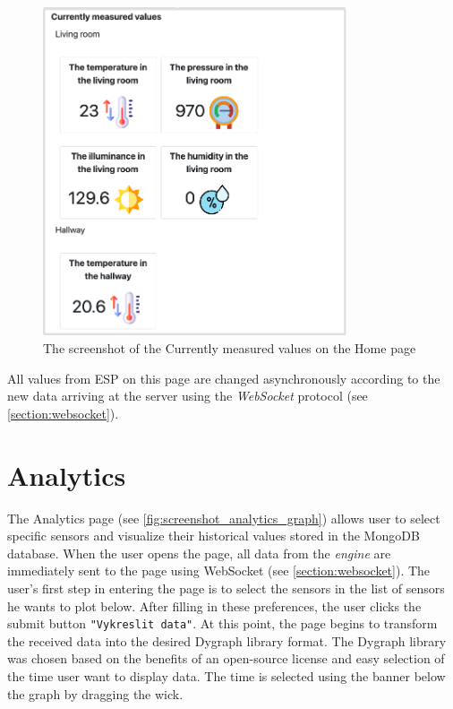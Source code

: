 \begin{figure}[H]
    \centering
    \includegraphics[width=0.8\textwidth]{img/screenshot_home_currently_measured_values.png}
    \caption{The screenshot of the Currently measured values on the Home page}
    \label{fig:screenshot_home_currently_measured_values}
\end{figure}

All values from ESP on this page are changed asynchronously according to the new data arriving at the server using the \textit{WebSocket} protocol (see \cref{section:websocket}).

\section{Analytics}

The Analytics page (see \cref{fig:screenshot_analytics_graph}) allows user to select specific sensors and visualize their historical values stored in the MongoDB database. When the user opens the page, all data from the \textit{engine} are immediately sent to the page using WebSocket (see \cref{section:websocket}). The user's first step in entering the page is to select the sensors in the list of sensors he wants to plot below. After filling in these preferences, the user clicks the submit button \texttt{"Vykreslit data"}. At this point, the page begins to transform the received data into the desired Dygraph library format. The Dygraph library was chosen based on the benefits of an open-source license and easy selection of the time user want to display data. The time is selected using the banner below the graph by dragging the wick.

